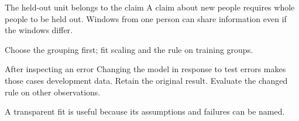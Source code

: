 \documentclass[aspectratio=169,11pt]{beamer}
\newcommand{\notestarget}{notes.pdf}\newcommand{\noteslabel}{Notes}
\begin{document}
\renewcommand{\notestarget}{notes.pdf\#note-count-the-errors-the-claim-actually-concerns}
\begin{frame}[t,fragile,label=slide-the-held-out-unit-belongs-to-the-claim]{The held-out unit belongs to the claim}
A claim about new people requires whole people to be held out.
\pause{}
Windows from one person can share information even if the windows differ.

Choose the grouping first; fit scaling and the rule on training groups.
\end{frame}
\renewcommand{\notestarget}{notes.pdf\#note-count-the-errors-the-claim-actually-concerns}
\begin{frame}[t,fragile,label=slide-after-inspecting-an-error]{After inspecting an error}
Changing the model in response to test errors makes those cases development data.
\pause{}
Retain the original result. Evaluate the changed rule on other observations.

A transparent fit is useful because its assumptions and failures can be named.
\end{frame}
\end{document}

